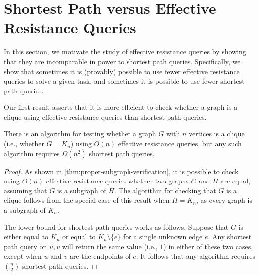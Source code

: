 \section{Shortest Path versus Effective Resistance Queries}
\label{sec:sp-versus-er}



In this section, we motivate the study of effective resistance queries by showing that they are incomparable in power to shortest path queries. Specifically, we show that sometimes it is (provably) possible to use fewer effective resistance queries to solve a given task, and sometimes it is possible to use fewer shortest path queries.

Our first result asserts that it is more efficient to check whether a graph is a clique using effective resistance queries than shortest path queries.
\begin{theorem} \label{thm:er-sp-clique}
There is an algorithm for testing whether a graph $G$ with $n$ vertices is a clique (i.e., whether $G = K_n$) using $O(n)$ effective resistance queries, but any such algorithm requires $\Omega(n^2)$ shortest path queries. 
\end{theorem}

\begin{proof}
As shown in \cref{thm:proper-subgraph-verification}, it is possible to check using $O(n)$ effective resistance queries whether two graphs $G$ and $H$ are equal, assuming that $G$ is a subgraph of $H$. The algorithm for checking that $G$ is a clique follows from the special case of this result when $H = K_n$, as every graph is a subgraph of $K_n$.

The lower bound for shortest path queries works as follows. Suppose that $G$ is either equal to $K_n$ or equal to $K_n \setminus \{e\}$ for a single unknown edge $e$. Any shortest path query on $u, v$ will return the same value (i.e., $1$) in either of these two cases, except when $u$ and $v$ are the endpoints of $e$. It follows that any algorithm requires $\binom{n}{2}$ shortest path queries.
\end{proof}


